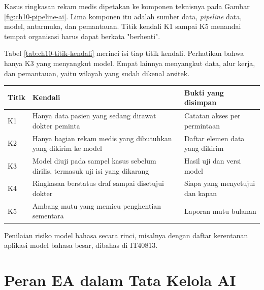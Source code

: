 \begin{pendalaman}
Kasus ringkasan rekam medis dipetakan ke komponen teknisnya pada Gambar
\ref{fig:ch10-pipeline-ai}. Lima komponen itu adalah sumber data,
\textit{pipeline} data, model, antarmuka, dan pemantauan. Titik kendali K1
sampai K5 menandai tempat organisasi harus dapat berkata "berhenti".

\begin{center}
  
  \label{fig:ch10-pipeline-ai}
\end{center}

Tabel \ref{tab:ch10-titik-kendali} merinci isi tiap titik kendali. Perhatikan
bahwa hanya K3 yang menyangkut model. Empat lainnya menyangkut data, alur
kerja, dan pemantauan, yaitu wilayah yang sudah dikenal arsitek.

\begin{center}
  \small
  \label{tab:ch10-titik-kendali}
  \begin{tabularx}{\linewidth}{lXX}
    \hline
    \textbf{Titik} & \textbf{Kendali} & \textbf{Bukti yang disimpan} \\
    \hline
    K1 & Hanya data pasien yang sedang dirawat dokter peminta & Catatan akses per permintaan \\
    \hline
    K2 & Hanya bagian rekam medis yang dibutuhkan yang dikirim ke model & Daftar elemen data yang dikirim \\
    \hline
    K3 & Model diuji pada sampel kasus sebelum dirilis, termasuk uji isi yang dikarang & Hasil uji dan versi model \\
    \hline
    K4 & Ringkasan berstatus draf sampai disetujui dokter & Siapa yang menyetujui dan kapan \\
    \hline
    K5 & Ambang mutu yang memicu penghentian sementara & Laporan mutu bulanan \\
    \hline
  \end{tabularx}
\end{center}

Penilaian risiko model bahasa secara rinci, misalnya dengan daftar kerentanan
aplikasi model bahasa besar, dibahas di IT40813.
\end{pendalaman}

\section{Peran EA dalam Tata Kelola AI}

